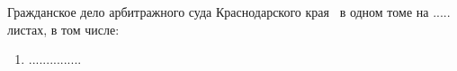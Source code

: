 Гражданское дело арбитражного суда Краснодарского края \delonum \, в одном томе на ..... листах, в том числе:
\begin{enumerate}
	\item ...............   

\end{enumerate}